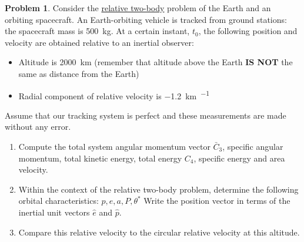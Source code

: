 \documentclass[10pt]{article}
\theoremstyle{definition}
\newtheorem{prob}{Problem}[section]
\newenvironment{subprob}%
{\renewcommand{\theenumi}{\alph{enumi}}\renewcommand{\labelenumi}{(\theenumi)}\begin{enumerate}}%
{\end{enumerate}}%
\begin{document}
\begin{prob}
    Consider the \underline{relative two-body} problem of the Earth and an orbiting spacecraft.
    An Earth-orbiting vehicle is tracked from ground stations: the spacecraft mass is \SI{500}{\kilo\gram}.
    At a certain instant, \( t_0 \), the following position and velocity are obtained relative to an inertial observer:
    \begin{itemize}
        \item Altitude is \SI{2000}{\kilo\meter} (remember that altitude above the Earth  \textbf{IS NOT} the same as distance from the Earth)
        \item Radial component of relative velocity is \SI{-1.2}{\kilo\meter\per\sec}
    \end{itemize}

    Assume that our tracking system is perfect and these measurements are made without any error.
    \begin{subprob}
        \item Compute the total system angular momentum vector \( \bar C_3 \), specific angular momentum, total kinetic energy, total energy \( C_4 \), specific energy and area velocity.
        \item Within the context of the relative two-body problem, determine the following orbital characteristics: \( p, e, a, P, \theta^* \)
            Write the position vector in terms of the inertial unit vectors \( \hat e\) and \( \hat p \).
        \item Compare this relative velocity to the circular relative velocity at this altitude.
    \end{subprob}
\end{prob}
\end{document}
